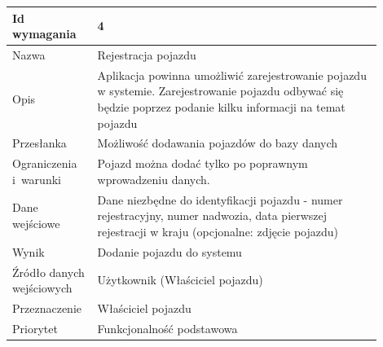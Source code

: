 \documentclass[12pt]{article}
\begin{document}
\begin{table}[H]
\begin{center}
	\begin{tabular}{|p{0.18\linewidth}|p{0.72\linewidth}|}%
	\hline
	Id wymagania 	& 4 				\\ \hline
	Nazwa			& Rejestracja pojazdu \\ \hline
	Opis & Aplikacja powinna umożliwić zarejestrowanie pojazdu w systemie. Zarejestrowanie pojazdu odbywać się będzie poprzez podanie kilku informacji na temat pojazdu
\\ \hline
	Przesłanka & Możliwość dodawania pojazdów do bazy danych  \\ \hline
	Ograniczenia i~warunki & Pojazd można dodać tylko po poprawnym wprowadzeniu danych.  \\ \hline
	Dane wejściowe &
Dane niezbędne do identyfikacji pojazdu - numer rejestracyjny, numer nadwozia, data pierwszej rejestracji w kraju
(opcjonalne: zdjęcie pojazdu)  \\ \hline
	Wynik & Dodanie pojazdu do systemu \\ \hline
	Źródło danych wejściowych & Użytkownik (Właściciel pojazdu) \\ \hline
	Przeznaczenie & Właściciel pojazdu \\ \hline
	Priorytet & Funkcjonalność podstawowa \\ \hline
	\end{tabular}

\end{center}
\end{table}
\end{document}
